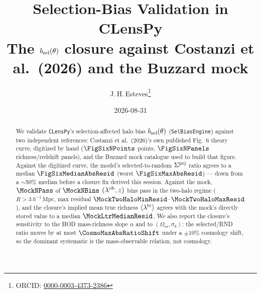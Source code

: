 \documentclass[a4paper, 11pt]{article}
\title{\vspace{-4ex}\huge \textbf{Selection-Bias Validation in CLensPy}\\[0.5ex]
       \Large \textbf{The $\bsel(\theta)$ closure against Costanzi et al.\
       (2026) and the Buzzard mock}}
\author{J.\,H.\,Esteves\thanks{ORCID:
  \href{https://orcid.org/0000-0003-4373-2386}{0000-0003-4373-2386}}}
\date{2026-08-31}
\newcommand{\modname}[1]{\textcolor{kwcol}{\texttt{#1}}}
\newcommand{\lob}{\lambda^{\rm ob}}
\newcommand{\ltr}{\lambda^{\rm tr}}
\newcommand{\hMpc}{h^{-1}\,\mathrm{Mpc}}
\newcommand{\Sprj}{\Sigma^{\rm prj}}
\newcommand{\bsel}{b_{\rm sel}}
\begin{document}
\maketitle

\begin{abstract}
We validate \modname{CLensPy}'s selection-affected halo bias
$\bsel(\theta)$ (\modname{SelBiasEngine}) against two independent
references: Costanzi et al.\ (2026)'s own published Fig.~6 theory curve,
digitized by hand ($\FigSixNPoints$ points, $\FigSixNPanels$
richness/redshift panels), and the Buzzard mock catalogue used to build
that figure. Against the digitized curve, the model's
selected-to-random $\Sprj$ ratio agrees to a median $\FigSixMedianAbsResid$
(worst $\FigSixMaxAbsResid$) --- down from a $\sim$50\% median before a
closure fix derived this session. Against the mock, $\MockNPass$ of
$\MockNBins$ $(\lob,z)$ bins pass in the two-halo regime ($R>3\,\hMpc$,
max residual $\MockTwoHaloMinResid$--$\MockTwoHaloMaxResid$), and the
closure's implied mean true richness $\langle\ltr\rangle$ agrees with the
mock's directly stored value to a median $\MockLtrMedianResid$. We also
report the closure's sensitivity to the HOD mass-richness slope $\alpha$
and to $(\Omega_m,\sigma_8)$: the selected/RND ratio moves by at most
$\CosmoMaxAbsRatioShift$ under a $\pm10\%$ cosmology shift, so the
dominant systematic is the mass-observable relation, not cosmology.
\end{abstract}

\tableofcontents







\end{document}
